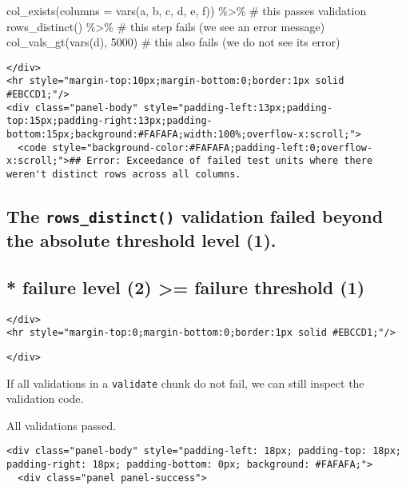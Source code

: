 \documentclass[
]{article}
\begin{document}
col\_exists(columns = vars(a, b, c, d, e, f)) \%\textgreater\% \# this
passes validation rows\_distinct() \%\textgreater\% \# this step fails
(we see an error message) col\_vals\_gt(vars(d), 5000) \# this also
fails (we do not see its error)

\begin{verbatim}
</div>
<hr style="margin-top:10px;margin-bottom:0;border:1px solid #EBCCD1;"/>
<div class="panel-body" style="padding-left:13px;padding-top:15px;padding-right:13px;padding-bottom:15px;background:#FAFAFA;width:100%;overflow-x:scroll;">
  <code style="background-color:#FAFAFA;padding-left:0;overflow-x:scroll;">## Error: Exceedance of failed test units where there weren't distinct rows across all columns.
\end{verbatim}

\hypertarget{the-rows_distinct-validation-failed-beyond-the-absolute-threshold-level-1.-1}{%
\subsection{\texorpdfstring{The \texttt{rows\_distinct()} validation
failed beyond the absolute threshold level
(1).}{The rows\_distinct() validation failed beyond the absolute threshold level (1).}}\label{the-rows_distinct-validation-failed-beyond-the-absolute-threshold-level-1.-1}}

\hypertarget{failure-level-2-failure-threshold-1-1}{%
\subsection{* failure level (2) \textgreater= failure threshold
(1)}\label{failure-level-2-failure-threshold-1-1}}

\begin{verbatim}
</div>
<hr style="margin-top:0;margin-bottom:0;border:1px solid #EBCCD1;"/>
\end{verbatim}

\begin{verbatim}
</div>
\end{verbatim}

If all validations in a \texttt{validate} chunk do not fail, we can
still inspect the validation code.

{All validations passed.}

\hypertarget{chunk-3214015}{}
\begin{verbatim}
<div class="panel-body" style="padding-left: 18px; padding-top: 18px; padding-right: 18px; padding-bottom: 0px; background: #FAFAFA;">
  <div class="panel panel-success">
\end{verbatim}
\end{document}

